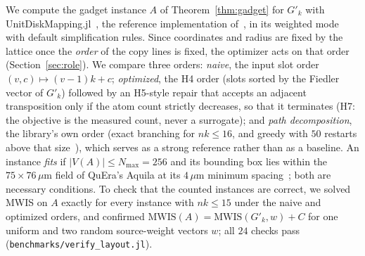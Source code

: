 \documentclass[a4paper,fleqn]{cas-sc}
\newcommand{\MWIS}{\mathrm{MWIS}}
\newcommand{\Nmax}{N_{\max}}
\begin{document}
We compute the gadget instance $A$ of Theorem~\ref{thm:gadget} for $G'_k$ with
UnitDiskMapping.jl~\cite{UnitDiskMapping}, the reference implementation
of~\cite{Nguyen2023}, in its weighted mode with default simplification rules. Since
coordinates and radius are fixed by the lattice once the \emph{order} of the copy
lines is fixed, the optimizer acts on that order (Section~\ref{sec:role}). We compare
three orders:
\emph{naive}, the input slot order $(v,c)\mapsto(v-1)k+c$; \emph{optimized}, the H4
order (slots sorted by the Fiedler vector of $G'_k$) followed by an H5-style repair
that accepts an adjacent transposition only if the atom count strictly decreases, so
that it terminates (H7: the objective is the measured count, never a surrogate); and
\emph{path decomposition}, the library's own order (exact branching for $nk\le16$, and
greedy with $50$ restarts above that size~\cite[App.~A]{Nguyen2023}), which serves as
a strong reference rather than as a baseline. An instance \emph{fits} if $|V(A)|\le\Nmax=256$ and its bounding box
lies within the $75\times76\,\mu$m field of QuEra's Aquila at its $4\,\mu$m minimum
spacing~\cite{Wurtz2023}; both are necessary conditions. To check that the counted
instances are correct, we solved MWIS on $A$ exactly for every instance with
$nk\le15$ under the naive and optimized orders, and confirmed
$\MWIS(A)=\MWIS(G'_k,w)+C$ for one uniform and two random source-weight vectors $w$;
all $24$ checks pass (\texttt{benchmarks/verify\_layout.jl}).
\end{document}
